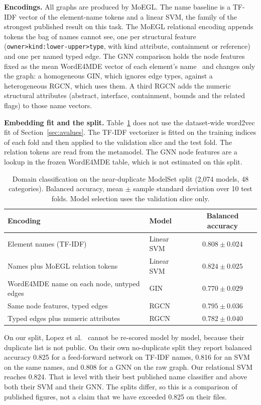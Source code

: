 \documentclass[journal,article,submit,moreauthors,technologies]{Definitions/mdpi}
\newcommand{\rev}[1]{#1}
\begin{document}
\rev{\textbf{Encodings.} All graphs are produced by MoEGL. The name baseline is a TF-IDF vector of the element-name tokens and a linear SVM, the family of the strongest published result on this task. The MoEGL relational encoding appends tokens the bag of names cannot see, one per structural feature (\texttt{owner>kind:lower-upper>type}, with kind attribute, containment or reference) and one per named typed edge. The GNN comparison holds the node features fixed as the mean WordE4MDE vector of each element's name~\cite{lopez2023word} and changes only the graph: a homogeneous GIN, which ignores edge types, against a heterogeneous RGCN, which uses them. A third RGCN adds the numeric structural attributes (abstract, interface, containment, bounds and the related flags) to those name vectors.}

\rev{\textbf{Embedding fit and the split.} Table~\ref{tab:learning} does not use the dataset-wide word2vec fit of Section~\ref{sec:avalues}. The TF-IDF vectorizer is fitted on the training indices of each fold and then applied to the validation slice and the test fold. The relation tokens are read from the metamodel. The GNN node features are a lookup in the frozen WordE4MDE table, which is not estimated on this split.}

\begin{table}[H]
\caption{\rev{Domain classification on the near-duplicate ModelSet split (2{,}074 models, 48 categories). Balanced accuracy, mean $\pm$ sample standard deviation over 10 test folds. Model selection uses the validation slice only.}\label{tab:learning}}
\centering
\small
\begin{tabular}{llc}
\toprule
\textbf{Encoding} & \textbf{Model} & \textbf{Balanced accuracy} \\
\midrule
\rev{Element names (TF-IDF)} & \rev{Linear SVM} & \rev{$0.808 \pm 0.024$} \\
\rev{Names plus MoEGL relation tokens} & \rev{Linear SVM} & \rev{$0.824 \pm 0.025$} \\
\rev{WordE4MDE name on each node, untyped edges} & \rev{GIN} & \rev{$0.770 \pm 0.029$} \\
\rev{Same node features, typed edges} & \rev{RGCN} & \rev{$0.795 \pm 0.036$} \\
\rev{Typed edges plus numeric attributes} & \rev{RGCN} & \rev{$0.782 \pm 0.040$} \\
\bottomrule
\end{tabular}
\end{table}

\rev{On our split, Lopez et al.~\cite{lopez2022classification} cannot be re-scored model by model, because their duplicate list is not public. On their own no-duplicate split they report balanced accuracy 0.825 for a feed-forward network on TF-IDF names, 0.816 for an SVM on the same names, and 0.808 for a GNN on the raw graph. Our relational SVM reaches 0.824. That is level with their best published name classifier and above both their SVM and their GNN. The splits differ, so this is a comparison of published figures, not a claim that we have exceeded 0.825 on their files.}
\end{document}
